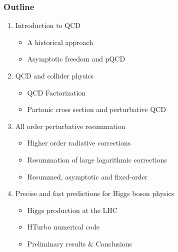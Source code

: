\documentclass[aspectratio=43]{beamer}
\begin{document}
\begin{frame}

	\frametitle{Outline}
	
	\begin{enumerate}
		\item {\color{blue}Introduction to QCD}
		\begin{itemize}
			\item A historical approach
			\item Asymptotic freedom and pQCD
		\end{itemize}
		\item {\color{blue}QCD and collider physics}
		\begin{itemize}
			\item QCD Factorization
			\item Partonic cross section and perturbative QCD
		\end{itemize}
		\item {\color{blue}All order perturbative resummation}
		\begin{itemize}
			\item Higher order radiative corrections
			\item Resummation of large logarithmic corrections
			\item Resummed, asymptotic and fixed-order
		\end{itemize}
		\item {\color{blue}Precise and fast predictions for Higgs boson physics}
		\begin{itemize}
			\item Higgs production at the LHC
			\item HTurbo numerical code
			\item Preliminary results $\&$ Conclusions
		\end{itemize}
	\end{enumerate}
	
\end{frame}

%
%

%
%

\begin{frame}


\end{frame}
\end{document}
